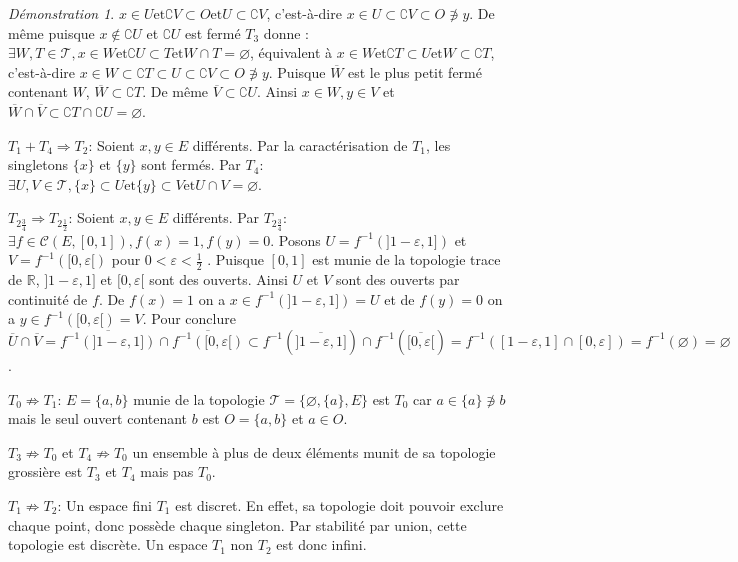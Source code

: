 \documentclass[a4paper, 11pt, french]{book}
\newenvironment{itemise}{\itemize}{\enditemize}
\theoremstyle{plain} %
\theoremstyle{definition} %
\theoremstyle{remark} %
\newtheorem*{demonstration}{Démonstration}
\newcommand{\1}{\mathds{1}}
\newcommand\vide{\varnothing}
\newcommand{\inv}[1]{#1^{-1}}
\newcommand{\et}{\mathrel{\mathrm{et}}}
\newcommand{\R}{\mathbb{R}}
\renewcommand{\cal}[1]{\mathcal{#1}}
\newcommand{\scr}[1]{\mathscr{#1}}
\begin{document}
\begin{demonstration}
\begin{itemise}
		$x\in U\et\complement V\subset O\et U\subset\complement V$, c'est-à-dire
		$x\in U\subset\complement V\subset O\not\ni y$.
		De même puisque $x\notin\complement U$ et $\complement U$ est fermé $T_3$ donne :
		$\exists W, T\in\scr{T}, x\in W\et\complement U\subset T\et W\cap T=\vide$, équivalent à
		$x\in W\et\complement T\subset U\et W\subset\complement T$, c'est-à-dire
		$x\in W\subset\complement T\subset U\subset\complement V\subset O\not\ni y$.
		Puisque $\overline{W}$ est le plus petit fermé contenant $W$, $\overline{W}\subset\complement T$.
		De même $\overline{V}\subset\complement U$.
		Ainsi $x\in W, y\in V$ et $\overline{W}\cap\overline{V}\subset\complement T\cap\complement U=\vide$.
		\item[$T_1+T_4\Rightarrow T_2$:] Soient $x, y\in E$ différents.
		Par la caractérisation de $T_1$, les singletons $\{x\}$ et $\{y\}$ sont fermés.
		Par $T_4$: $\exists U, V\in\scr{T}, \{x\}\subset U\et\{y\}\subset V\et U\cap V=\vide$.
		\item[$T_{2\frac{3}{4}}\Rightarrow T_{2\frac{1}{2}}$:] Soient $x, y\in E$ différents.
		Par $T_{2\frac{3}{4}}$: $\exists f\in\cal{C}(E, [0, 1]), f(x)=1, f(y)=0$.
		Posons $U=\inv{f}(]1-\varepsilon, 1])$ et $V=\inv{f}([0, \varepsilon[)$ pour $0<\varepsilon<\frac{1}{2}$ .
		Puisque $[0, 1]$ est munie de la topologie trace de $\R$, $]1-\varepsilon, 1]$ et $[0, \varepsilon[$ sont des ouverts.
		Ainsi $U$ et $V$ sont des ouverts par continuité de $f$.
		De $f(x)=1$ on a $x\in\inv{f}(]1-\varepsilon, 1])=U$ et de $f(y)=0$ on a $y\in\inv{f}([0, \varepsilon[)=V$.
		Pour conclure
		$\overline{U}\cap\overline{V}
			=\overline{\inv{f}(]1-\varepsilon, 1])}\cap\overline{\inv{f}([0, \varepsilon[)}
			\subset\inv{f}(\overline{]1-\varepsilon, 1]})\cap\inv{f}(\overline{[0, \varepsilon[})
			=\inv{f}([1-\varepsilon, 1]\cap[0, \varepsilon])
			=\inv{f}(\vide)
			=\vide$.
		\item[$T_0\not\Rightarrow T_1$:] $E=\{a, b\}$ munie de la topologie $\scr{T}=\{\vide, \{a\}, E\}$ est $T_0$ car $a\in\{a\}\not\ni b$ mais le seul ouvert contenant $b$ est $O=\{a, b\}$ et $a\in O$.
		\item[$T_3\not\Rightarrow T_0$ et $T_4\not\Rightarrow T_0$] un ensemble à plus de deux éléments munit de sa topologie grossière est $T_3$ et $T_4$ mais pas $T_0$.
		\item[$T_1\not\Rightarrow T_2$:] Un espace fini $T_1$ est discret.
		En effet, sa topologie doit pouvoir exclure chaque point, donc possède chaque singleton.
		Par stabilité par union, cette topologie est discrète.
		Un espace $T_1$ non $T_2$ est donc infini.

\end{itemise}
\end{demonstration}
\end{document}

